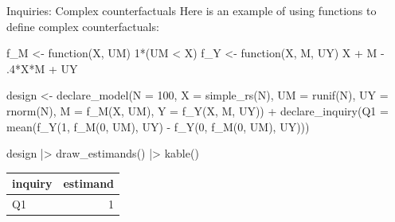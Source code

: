 \documentclass[
  11pt,
  ignorenonframetext,
]{beamer}
\newenvironment{Shaded}{\begin{snugshade}}{\end{snugshade}}
\newcommand{\AttributeTok}[1]{\textcolor[rgb]{0.40,0.45,0.13}{#1}}
\newcommand{\ControlFlowTok}[1]{\textcolor[rgb]{0.00,0.23,0.31}{#1}}
\newcommand{\DecValTok}[1]{\textcolor[rgb]{0.68,0.00,0.00}{#1}}
\newcommand{\FunctionTok}[1]{\textcolor[rgb]{0.28,0.35,0.67}{#1}}
\newcommand{\NormalTok}[1]{\textcolor[rgb]{0.00,0.23,0.31}{#1}}
\newcommand{\OtherTok}[1]{\textcolor[rgb]{0.00,0.23,0.31}{#1}}
\newcommand{\SpecialCharTok}[1]{\textcolor[rgb]{0.37,0.37,0.37}{#1}}
\begin{document}
\begin{frame}[fragile]{Inquiries: Complex counterfactuals}
\protect\hypertarget{inquiries-complex-counterfactuals}{}
Here is an example of using functions to define complex counterfactuals:

\begin{Shaded}
\begin{Highlighting}[]
\NormalTok{f\_M }\OtherTok{\textless{}{-}} \ControlFlowTok{function}\NormalTok{(X, UM) }\DecValTok{1}\SpecialCharTok{*}\NormalTok{(UM }\SpecialCharTok{\textless{}}\NormalTok{ X)}
\NormalTok{f\_Y }\OtherTok{\textless{}{-}} \ControlFlowTok{function}\NormalTok{(X, M, UY) X }\SpecialCharTok{+}\NormalTok{ M }\SpecialCharTok{{-}}\NormalTok{ .}\DecValTok{4}\SpecialCharTok{*}\NormalTok{X}\SpecialCharTok{*}\NormalTok{M }\SpecialCharTok{+}\NormalTok{ UY}

\NormalTok{design }\OtherTok{\textless{}{-}} 
  \FunctionTok{declare\_model}\NormalTok{(}\AttributeTok{N =} \DecValTok{100}\NormalTok{,}
                \AttributeTok{X =} \FunctionTok{simple\_rs}\NormalTok{(N),}
                \AttributeTok{UM =} \FunctionTok{runif}\NormalTok{(N),}
                \AttributeTok{UY =} \FunctionTok{rnorm}\NormalTok{(N),}
                \AttributeTok{M =} \FunctionTok{f\_M}\NormalTok{(X, UM),}
                \AttributeTok{Y =} \FunctionTok{f\_Y}\NormalTok{(X, M, UY)) }\SpecialCharTok{+}
  \FunctionTok{declare\_inquiry}\NormalTok{(}\AttributeTok{Q1 =} \FunctionTok{mean}\NormalTok{(}\FunctionTok{f\_Y}\NormalTok{(}\DecValTok{1}\NormalTok{, }\FunctionTok{f\_M}\NormalTok{(}\DecValTok{0}\NormalTok{, UM), UY) }\SpecialCharTok{{-}} \FunctionTok{f\_Y}\NormalTok{(}\DecValTok{0}\NormalTok{, }\FunctionTok{f\_M}\NormalTok{(}\DecValTok{0}\NormalTok{, UM), UY)))}

\NormalTok{design }\SpecialCharTok{|\textgreater{}} \FunctionTok{draw\_estimands}\NormalTok{() }\SpecialCharTok{|\textgreater{}} \FunctionTok{kable}\NormalTok{()}
\end{Highlighting}
\end{Shaded}

\begin{tabular}{l|r}
\hline
inquiry & estimand\\
\hline
Q1 & 1\\
\hline
\end{tabular}
\end{frame}
\end{document}
